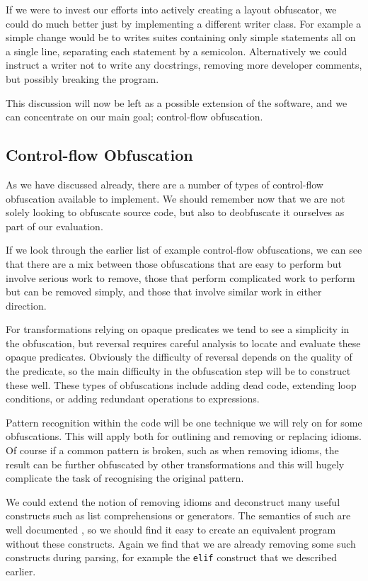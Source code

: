 \documentclass[twoside,a4paper]{report}
\begin{document}
If we were to invest our efforts into actively creating a layout obfuscator, we could do much better just by implementing
a different writer class. For example a simple change would be to writes suites containing only simple statements all on a single
line, separating each statement by a semicolon. Alternatively we could instruct a writer not to write any docstrings, removing more
developer comments, but possibly breaking the program.

This discussion will now be left as a possible extension of the software, and we can concentrate on our main goal;
control-flow obfuscation.

\subsection{Control-flow Obfuscation}

As we have discussed already, there are a number of types of control-flow obfuscation available to implement. We should
remember now that we are not solely looking to obfuscate source code, but also to deobfuscate it ourselves as part of
our evaluation.

If we look through the earlier list of example control-flow obfuscations, we can see that there are a mix between those
obfuscations that are easy to perform but involve serious work to remove, those that perform complicated work to perform
but can be removed simply, and those that involve similar work in either direction.

For transformations relying on opaque predicates we tend to see a simplicity in the obfuscation, but
reversal requires careful analysis to locate and evaluate these opaque predicates. Obviously the difficulty of reversal depends
on the quality of the predicate, so the main difficulty in the obfuscation step will be to construct these well. These types
of obfuscations include adding dead code, extending loop conditions, or adding redundant operations to expressions.

Pattern recognition within the code will be one technique we will rely on for some obfuscations. This will apply both for
outlining and removing or replacing idioms. Of course if a common pattern is broken, such as when removing idioms, the result can
be further obfuscated by other transformations and this will hugely complicate the task of recognising the original pattern.

We could extend the notion of removing idioms and deconstruct many useful constructs such as list comprehensions or generators.
The semantics of such are well documented \cite{genexpr}, so we should find it easy to create an equivalent program without
these constructs. Again we find that we are already removing some such constructs during parsing, for example the \texttt{elif}
construct that we described earlier.
\end{document}
